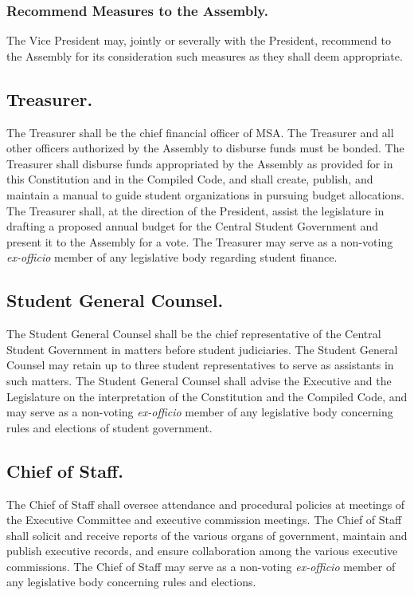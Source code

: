 \subsubsection{Recommend Measures to the Assembly.}
The Vice President may, jointly or severally with the President, recommend to the Assembly for its consideration such measures as they shall deem appropriate.


\subsection{Treasurer.}
The Treasurer shall be the chief financial officer of MSA. The Treasurer and all other officers authorized by the Assembly to disburse funds must be bonded. The Treasurer shall disburse funds appropriated by the Assembly as provided for in this Constitution and in the Compiled Code, and shall create, publish, and maintain a manual to guide student organizations in pursuing budget allocations. The Treasurer shall, at the direction of the President, assist the legislature in drafting a proposed annual budget for the Central Student Government and present it to the Assembly for a vote. The Treasurer may serve as a non-voting \textit{ex-officio} member of any legislative body regarding student finance.

\subsection{Student General Counsel.}
The Student General Counsel shall be the chief representative of the Central Student Government in matters before student judiciaries. The Student General Counsel may retain up to three student representatives to serve as assistants in such matters. The Student General Counsel shall advise the Executive and the Legislature on the interpretation of the Constitution and the Compiled Code, and may serve as a non-voting \textit{ex-officio} member of any legislative body concerning rules and elections of student government.

\subsection{Chief of Staff.}
The Chief of Staff shall oversee attendance and procedural policies at meetings of the Executive Committee and executive commission meetings. The Chief of Staff shall solicit and receive reports of the various organs of government, maintain and publish executive records, and ensure collaboration among the various executive commissions. The Chief of Staff may serve as a non-voting \textit{ex-officio} member of any legislative body concerning rules and elections.

